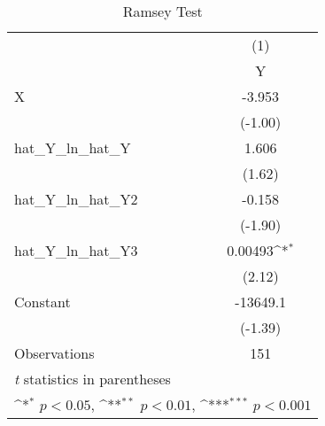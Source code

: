 \begin{table}[htbp]\centering
\def\sym#1{\ifmmode^{#1}\else\(^{#1}\)\fi}
\caption{Ramsey Test}
\begin{tabular}{l*{1}{c}}
\hline\hline
                    &\multicolumn{1}{c}{(1)}\\
                    &\multicolumn{1}{c}{Y}\\
\hline
X                   &      -3.953         \\
                    &     (-1.00)         \\
[1em]
hat\_Y\_ln\_hat\_Y      &       1.606         \\
                    &      (1.62)         \\
[1em]
hat\_Y\_ln\_hat\_Y2     &      -0.158         \\
                    &     (-1.90)         \\
[1em]
hat\_Y\_ln\_hat\_Y3     &     0.00493\sym{*}  \\
                    &      (2.12)         \\
[1em]
Constant            &    -13649.1         \\
                    &     (-1.39)         \\
\hline
Observations        &         151         \\
\hline\hline
\multicolumn{2}{l}{\footnotesize \textit{t} statistics in parentheses}\\
\multicolumn{2}{l}{\footnotesize \sym{*} \(p<0.05\), \sym{**} \(p<0.01\), \sym{***} \(p<0.001\)}\\
\end{tabular}
\end{table}
